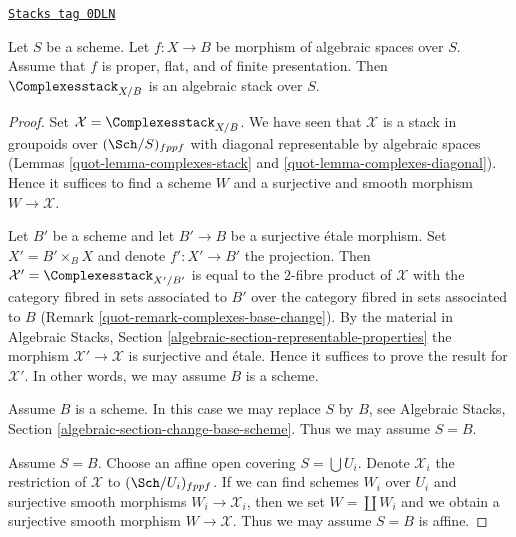 \begin{theorem}

\label{quot-theorem-complexes-algebraic}
\href{https://stacks.math.columbia.edu/tag/0DLN}{\texttt{Stacks tag 0DLN}}

\begin{reference}
\cite{lieblich-complexes}
\end{reference}
Let $S$ be a scheme. Let $f : X \to B$ be morphism of algebraic spaces
over $S$. Assume that $f$ is proper, flat, and of finite presentation.
Then $\Complexesstack_{X/B}$ is an algebraic stack over $S$.
\end{theorem}

\begin{proof}

Set $\mathcal{X} = \Complexesstack_{X/B}$. We have seen that $\mathcal{X}$
is a stack in groupoids over $(\Sch/S)_{fppf}$ with diagonal representable
by algebraic spaces
(Lemmas \ref{quot-lemma-complexes-stack} and \ref{quot-lemma-complexes-diagonal}).
Hence it suffices to find a scheme $W$ and a surjective and smooth
morphism $W \to \mathcal{X}$.

\medskip\noindent
Let $B'$ be a scheme and let $B' \to B$ be a surjective \'etale morphism.
Set $X' = B' \times_B X$ and denote $f' : X' \to B'$ the projection.
Then $\mathcal{X}' = \Complexesstack_{X'/B'}$ is equal to the $2$-fibre
product of $\mathcal{X}$ with the category fibred in sets
associated to $B'$ over the category fibred in sets associated to $B$
(Remark \ref{quot-remark-complexes-base-change}). By the material in
Algebraic Stacks, Section \ref{algebraic-section-representable-properties}
the morphism $\mathcal{X}' \to \mathcal{X}$ is surjective and \'etale.
Hence it suffices to prove the result for $\mathcal{X}'$.
In other words, we may assume $B$ is a scheme.

\medskip\noindent
Assume $B$ is a scheme. In this case we may replace $S$ by $B$, see
Algebraic Stacks, Section \ref{algebraic-section-change-base-scheme}.
Thus we may assume $S = B$.

\medskip\noindent
Assume $S = B$. Choose an affine open covering $S = \bigcup U_i$.
Denote $\mathcal{X}_i$ the restriction of $\mathcal{X}$ to
$(\Sch/U_i)_{fppf}$. If we can find schemes $W_i$ over $U_i$ and
surjective smooth morphisms $W_i \to \mathcal{X}_i$, then we
set $W = \coprod W_i$ and we obtain a surjective smooth morphism
$W \to \mathcal{X}$. Thus we may assume $S = B$ is affine.


\end{proof}
